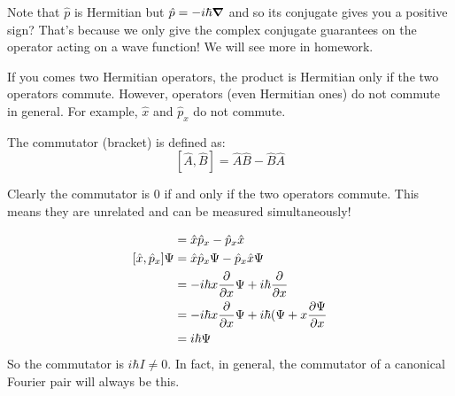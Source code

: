 Note that $\hat{p}$ is Hermitian but $\hat{p} = - i \hbar \grad$ and so its conjugate gives you a positive sign? That's because we only give the complex conjugate
guarantees on the operator acting on a wave function! We will see more in homework.

If you comes two Hermitian operators, the product is Hermitian only if the two operators commute. However, operators (even Hermitian ones) do not commute in general.
For example, $\hat{x}$ and $\hat{p}_x$ do not commute.

\begin{definition}
    The commutator (bracket) is defined as:
    \[ [\hat{A}, \hat{B}] = \hat{A} \hat{B} - \hat{B} \hat{A} \]
\end{definition}
Clearly the commutator is 0 if and only if the two operators commute. This means they are unrelated and can be measured simultaneously!

\begin{align*}
    [\hat{x}, \hat{p}_x] &= \hat{x} \hat{p}_x - \hat{p}_x \hat{x} \\
    [\hat{x}, \hat{p}_x] \Psi &= \hat{x} \hat{p}_x \Psi - \hat{p}_x \hat{x} \Psi \\
    &= - i \hbar x \partialderivative{}{x} \Psi + i \hbar \partialderivative{}{x} (x \Psi) \\
    &= - i \hbar x \partialderivative{}{x} \Psi + i \hbar (\Psi + x \partialderivative{\Psi}{x} \\
    &= i \hbar \Psi
\end{align*}
So the commutator is $i \hbar I \neq 0$. In fact, in general, the commutator of a canonical Fourier pair will always be this.